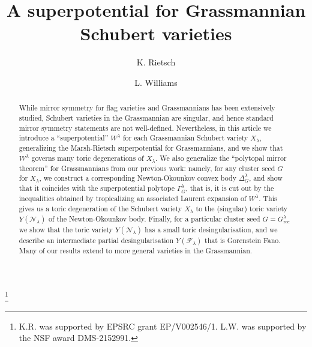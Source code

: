 \documentclass{amsart}
\theoremstyle{definition}
\numberwithin{equation}{section}
\newcommand{\FF}{\mathcal{F}}
\newcommand{\NN}{\mathcal{N}}
\newcommand{\rect}{\mathrm{rec}}
\begin{document}
\title{A superpotential for Grassmannian Schubert varieties}

\author{K. Rietsch}
\address{Department of Mathematics,
            King's College London,
            Strand, London
            WC2R 2LS
            UK
}
%
\author{L. Williams}%
\address{Department of Mathematics,
            Harvard University,
            Cambridge, MA
	    USA
}
%





\thanks{K.R. was supported by EPSRC grant EP/V002546/1.
L.W. was supported by 
 the NSF award
 DMS-2152991.}
\subjclass{}



\begin{abstract} 
While mirror symmetry for flag varieties and Grassmannians 
has been extensively studied, Schubert varieties in the Grassmannian
are singular, and hence standard mirror symmetry statements are not 
well-defined.  Nevertheless, in this article we introduce a 
``superpotential'' $W^{\lambda}$
for each Grassmannian Schubert variety $X_{\lambda}$, generalizing the Marsh-Rietsch superpotential for Grassmannians,
and we show that $W^{\lambda}$ governs many toric degenerations
of $X_{\lambda}$.  We also generalize the ``polytopal mirror theorem''
for Grassmannians from our previous work: namely,  
for any cluster seed $G$ for $X_{\lambda}$, we construct a  corresponding  
Newton-Okounkov convex body $\Delta_G^{\lambda}$, and show that it coincides
with the superpotential polytope $\Gamma_G^{\lambda}$, that is,
it is cut out by the inequalities obtained by tropicalizing 
an associated Laurent expansion of $W^{\lambda}$.
This gives us a toric degeneration
of the Schubert variety $X_{\lambda}$ to the (singular)
toric variety $Y(\NN_{\lambda})$
 of the Newton-Okounkov body.  Finally, for a particular cluster seed  $G=G^\lambda_\rect$ we show that the toric variety
$Y(\NN_{\lambda})$
has a small toric desingularisation, and we describe an intermediate partial desingularisation $Y(\FF_\lambda)$  that is Gorenstein Fano. 
Many of our results extend to more general varieties in the Grassmannian.
 \end{abstract}


\maketitle
\setcounter{tocdepth}{1}
\tableofcontents
\end{document}
